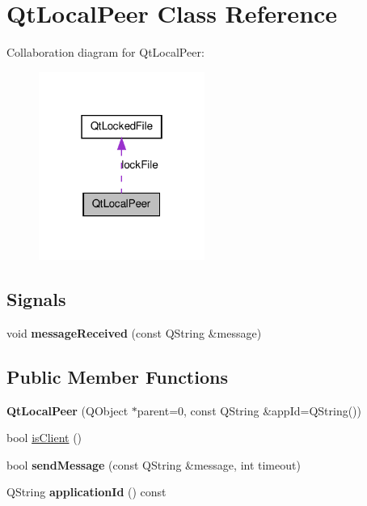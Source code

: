 \hypertarget{class_qt_local_peer}{
\section{QtLocalPeer Class Reference}
\label{class_qt_local_peer}
}


Collaboration diagram for QtLocalPeer:
\nopagebreak
\begin{figure}[H]
\begin{center}
\leavevmode
\includegraphics[width=154pt]{class_qt_local_peer__coll__graph}
\end{center}
\end{figure}
\subsection*{Signals}
\begin{DoxyCompactItemize}
\item 
\hypertarget{class_qt_local_peer_a4436ad976edb6f177de1300b5aab9bfe}{
void {\bfseries messageReceived} (const QString \&message)}
\label{class_qt_local_peer_a4436ad976edb6f177de1300b5aab9bfe}

\end{DoxyCompactItemize}
\subsection*{Public Member Functions}
\begin{DoxyCompactItemize}
\item 
\hypertarget{class_qt_local_peer_a7f6f94203a6ece5b14c8c800da1e40ab}{
{\bfseries QtLocalPeer} (QObject $\ast$parent=0, const QString \&appId=QString())}
\label{class_qt_local_peer_a7f6f94203a6ece5b14c8c800da1e40ab}

\item 
bool \hyperlink{class_qt_local_peer_a72f4ec6cda404661094778f98296d2a9}{isClient} ()
\item 
\hypertarget{class_qt_local_peer_ab239cb6dcea36512d43df6ca07881ea7}{
bool {\bfseries sendMessage} (const QString \&message, int timeout)}
\label{class_qt_local_peer_ab239cb6dcea36512d43df6ca07881ea7}

\item 
\hypertarget{class_qt_local_peer_a2f7d615b1eebd738a4025894d8e213d4}{
QString {\bfseries applicationId} () const }
\label{class_qt_local_peer_a2f7d615b1eebd738a4025894d8e213d4}

\end{DoxyCompactItemize}
